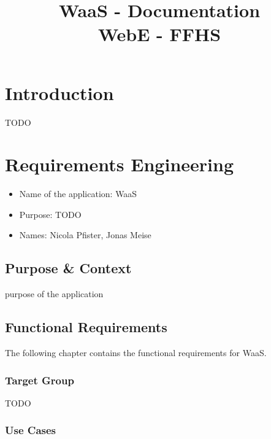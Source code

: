 \documentclass[titlepage, 12pt]{article}
\author{\authorName}
\title{WaaS - Documentation \\ \medskip \large WebE - FFHS}
\begin{document}
\maketitle

\pagebreak

\renewcommand{\contentsname}{Table of Contents}

\tableofcontents

\pagebreak

\section{Introduction}

TODO

\section{Requirements Engineering\label{sectionRequirementsEngineering}}

\begin{itemize}
    \item Name of the application: WaaS
    \item Purpose: TODO
    \item Names: Nicola Pfister, Jonas Meise
\end{itemize}


\subsection{Purpose \& Context}

purpose of the application

\subsection{Functional Requirements}

The following chapter contains the functional requirements for WaaS.

\subsubsection{Target Group}

TODO

\subsubsection{{Use Cases}}
\end{document}
